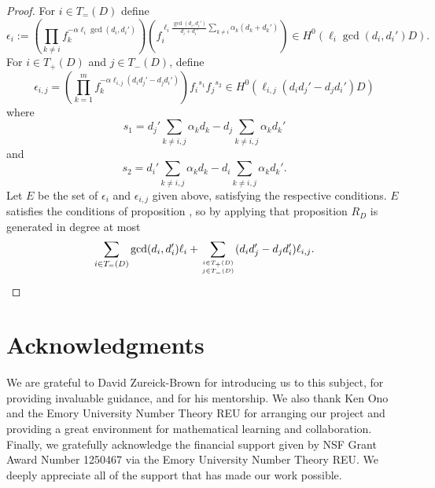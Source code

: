 \documentclass{amsart}
\theoremstyle{plain}
\theoremstyle{definition}
\theoremstyle{remark}
\numberwithin{equation}{section}
\begin{document}
\begin{proof}
For $i \in T_=(D)$
define
\[
	\epsilon_i := (\prod_{k \ne i} f_k^{-\alpha \ell_i \gcd(d_i, d_i')}) (f_i^{\ell_i \frac{\gcd(d_i, d_i')}{d_i + d_i'}\sum_{k \ne i} \alpha_k (d_k + d_k')}) \in H^0(\ell_i \gcd(d_i, d_i') D).
\]
For $i \in T_+(D)$ and $j \in T_-(D)$, define
\[
	\epsilon_{i, j} = (\prod_{k = 1}^m f_k^{-\alpha \ell_{i,j} (d_i d_j' - d_j d_i')}) {f_i}^{s_1} {f_j}^{s_2} \in H^0(\ell_{i,j}(d_i d_j' - d_j d_i')D)
\]
where
\[
	s_1 = d_j' \sum_{k \ne i,j} \alpha_k d_k - d_j \sum_{k\ne i, j} \alpha_k d_k'
\]
and
\[
	s_2 = d_i' \sum_{k \ne i,j} \alpha_k d_k - d_i \sum_{k \ne i, j} \alpha_k d_k'.
\]
Let $E$ be the set of $\epsilon_i$ and $\epsilon_{i,j}$ given above, satisfying the respective conditions.
$E$ satisfies the conditions of proposition , so by applying that proposition $R_D$ is generated in degree at most
\[
	\sum_{i\in T_=(D)} \gcd(d_i, d_i')\ell_i + \sum_{i\in T_+(D) \atop j\in T_-(D)} (d_i d_j'- d_j d_i')\ell_{i,j}.
\]

\end{proof}



\section{Acknowledgments}

We are grateful to David Zureick-Brown for introducing us to this
subject, for providing invaluable guidance,
and for his mentorship. We also thank Ken Ono and the
Emory University Number Theory REU for arranging our project and
providing a great environment for mathematical learning and
collaboration.
Finally, we gratefully acknowledge the financial support given by
NSF Grant Award Number 1250467 via the Emory University Number
Theory REU. We deeply appreciate all of the support that has made
our work possible.


\nocite{*}
{}

\end{document}
